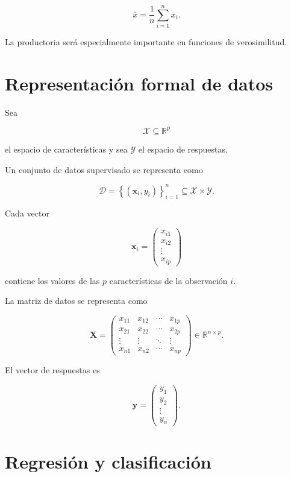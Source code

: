 \documentclass[
  spanish,
  10.5pt,
  letterpaper,
  DIV=11,
  numbers=noendperiod,
  oneside,
  open=any]{scrreprt}
\theoremstyle{definition}
\theoremstyle{definition}
\theoremstyle{plain}
\theoremstyle{remark}
\begin{document}
\[
\bar{x}
=
\frac{1}{n}
\sum_{i=1}^{n}x_i.
\]

La productoria será especialmente importante en funciones de
verosimilitud.

\section*{Representación formal de
datos}\label{representaciuxf3n-formal-de-datos}


Sea

\[
\mathcal{X}\subseteq\mathbb{R}^{p}
\]

el espacio de características y sea \(\mathcal{Y}\) el espacio de
respuestas.

Un conjunto de datos supervisado se representa como

\[
\mathcal{D}
=
\left\{
(\mathbf{x}_i,y_i)
\right\}_{i=1}^{n}
\subseteq
\mathcal{X}\times\mathcal{Y}.
\]

Cada vector

\[
\mathbf{x}_i
=
\begin{pmatrix}
x_{i1}\\
x_{i2}\\
\vdots\\
x_{ip}
\end{pmatrix}
\]

contiene los valores de las \(p\) características de la observación
\(i\).

La matriz de datos se representa como

\[
\mathbf{X}
=
\begin{pmatrix}
x_{11} & x_{12} & \cdots & x_{1p}\\
x_{21} & x_{22} & \cdots & x_{2p}\\
\vdots & \vdots & \ddots & \vdots\\
x_{n1} & x_{n2} & \cdots & x_{np}
\end{pmatrix}
\in\mathbb{R}^{n\times p}.
\]

El vector de respuestas es

\[
\mathbf{y}
=
\begin{pmatrix}
y_1\\
y_2\\
\vdots\\
y_n
\end{pmatrix}.
\]

\section*{Regresión y
clasificación}\label{regresiuxf3n-y-clasificaciuxf3n}
\end{document}

